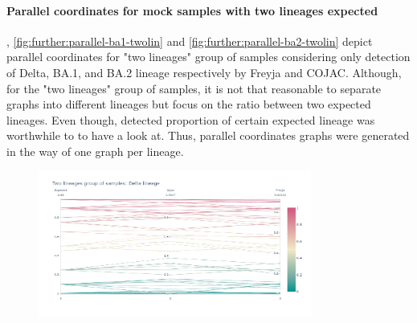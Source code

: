         \paragraph{Parallel coordinates for mock samples with two lineages expected} \label{sec:appendix:figures:parallel-twolin}
        , \cref{fig:further:parallel-ba1-twolin} and \cref{fig:further:parallel-ba2-twolin} depict parallel coordinates for "two lineages" group of samples considering only detection of Delta, BA.1, and BA.2 lineage respectively by Freyja and COJAC. Although, for the "two lineages" group of samples, it is not that reasonable to separate graphs into different lineages but focus on the ratio between two expected lineages. Even though, detected proportion of certain expected lineage was worthwhile to to have a look at. Thus, parallel coordinates graphs were generated in the way of one graph per lineage.
        \begin{figure}[H]
        	\centering
            \includegraphics[width=0.8\textwidth]{figures/further/pc-twolin-delta.png}
            \label{fig:further:parallel-delta-twolin}
        \end{figure}
